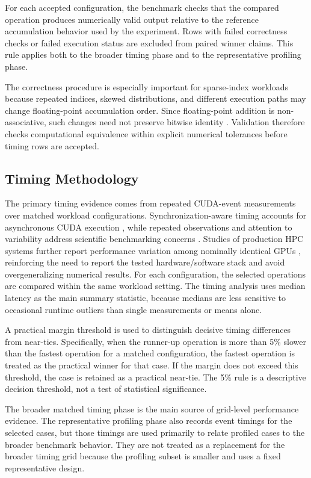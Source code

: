 For each accepted configuration, the benchmark checks that the compared operation produces numerically valid output relative to the reference accumulation behavior used by the experiment. Rows with failed correctness checks or failed execution status are excluded from paired winner claims. This rule applies both to the broader timing phase and to the representative profiling phase.

The correctness procedure is especially important for sparse-index workloads because repeated indices, skewed distributions, and different execution paths may change floating-point accumulation order. Since floating-point addition is non-associative, such changes need not preserve bitwise identity \citep{shanmugavelu2024nonassociativity}. Validation therefore checks computational equivalence within explicit numerical tolerances before timing rows are accepted.

\subsection{Timing Methodology}

The primary timing evidence comes from repeated CUDA-event measurements over matched workload configurations. Synchronization-aware timing accounts for asynchronous CUDA execution \citep{nvidia2026cudaguide}, while repeated observations and attention to variability address scientific benchmarking concerns \citep{hoefler2015benchmarking}. Studies of production HPC systems further report performance variation among nominally identical GPUs \citep{sinha2022variability}, reinforcing the need to report the tested hardware/software stack and avoid overgeneralizing numerical results. For each configuration, the selected operations are compared within the same workload setting. The timing analysis uses median latency as the main summary statistic, because medians are less sensitive to occasional runtime outliers than single measurements or means alone.

A practical margin threshold is used to distinguish decisive timing differences from near-ties. Specifically, when the runner-up operation is more than 5\% slower than the fastest operation for a matched configuration, the fastest operation is treated as the practical winner for that case. If the margin does not exceed this threshold, the case is retained as a practical near-tie. The 5\% rule is a descriptive decision threshold, not a test of statistical significance.

The broader matched timing phase is the main source of grid-level performance evidence. The representative profiling phase also records event timings for the selected cases, but those timings are used primarily to relate profiled cases to the broader benchmark behavior. They are not treated as a replacement for the broader timing grid because the profiling subset is smaller and uses a fixed representative design.

